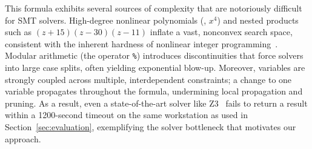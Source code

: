 This formula exhibits several sources of complexity that are notoriously difficult for SMT solvers. High-degree nonlinear polynomials (\eg, $x^4$) and nested products such as $(z+15)(z-30)(z-11)$ inflate a vast, nonconvex search space, consistent with the inherent hardness of nonlinear integer programming~\cite{murty2002complexity}. Modular arithmetic (the operator \texttt{\%}) introduces discontinuities that force solvers into large case splits, often yielding exponential blow-up. Moreover, variables are strongly coupled across multiple, interdependent constraints; a change to one variable propagates throughout the formula, undermining local propagation and pruning. As a result, even a state-of-the-art solver like Z3~\cite{demoura2008z3} fails to return a result within a 1200-second timeout on the same workstation as used in Section~\ref{sec:evaluation}, exemplifying the solver bottleneck that motivates our approach. 




